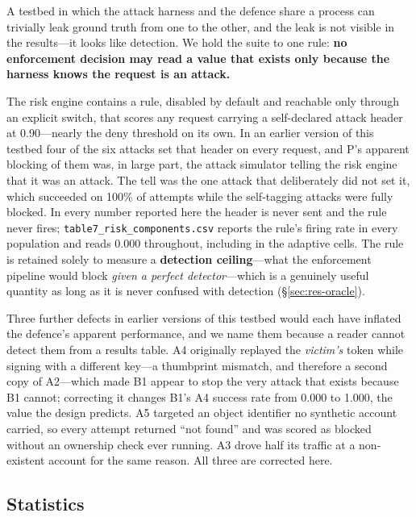 A testbed in which the attack harness and the defence share a process can trivially leak ground truth from one to the other, and the leak is not visible in the results---it looks like detection. We hold the suite to one rule: \textbf{no enforcement decision may read a value that exists only because the harness knows the request is an attack.}

The risk engine contains a rule, disabled by default and reachable only through an explicit switch, that scores any request carrying a self-declared attack header at 0.90---nearly the deny threshold on its own. In an earlier version of this testbed four of the six attacks set that header on every request, and P's apparent blocking of them was, in large part, the attack simulator telling the risk engine that it was an attack. The tell was the one attack that deliberately did not set it, which succeeded on 100\% of attempts while the self-tagging attacks were fully blocked. In every number reported here the header is never sent and the rule never fires; \texttt{table7\_risk\_components.csv} reports the rule's firing rate in every population and reads 0.000 throughout, including in the adaptive cells. The rule is retained solely to measure a \textbf{detection ceiling}---what the enforcement pipeline would block \textit{given a perfect detector}---which is a genuinely useful quantity as long as it is never confused with detection (\S\ref{sec:res-oracle}).

Three further defects in earlier versions of this testbed would each have inflated the defence's apparent performance, and we name them because a reader cannot detect them from a results table. A4 originally replayed the \textit{victim's} token while signing with a different key---a thumbprint mismatch, and therefore a second copy of A2---which made B1 appear to stop the very attack that exists because B1 cannot; correcting it changes B1's A4 success rate from 0.000 to 1.000, the value the design predicts. A5 targeted an object identifier no synthetic account carried, so every attempt returned ``not found'' and was scored as blocked without an ownership check ever running. A3 drove half its traffic at a non-existent account for the same reason. All three are corrected here.

\subsection{Statistics}
\label{sec:method-stats}

